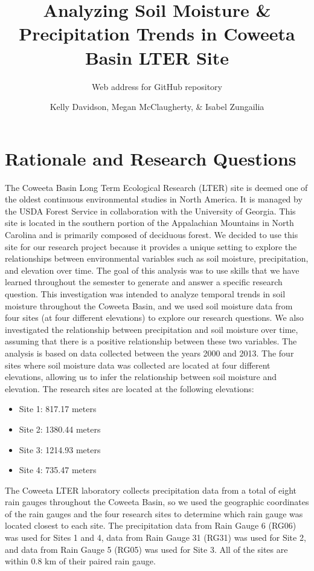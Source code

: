 \documentclass[
  12pt,
]{article}
\title{Analyzing Soil Moisture \& Precipitation Trends in Coweeta Basin
LTER Site}
\subtitle{Web address for GitHub repository}
\author{Kelly Davidson, Megan McClaugherty, \& Isabel Zungailia}
\date{}
\providecommand{\tightlist}{%
  \setlength{\itemsep}{0pt}\setlength{\parskip}{0pt}}
\begin{document}
\maketitle

\newpage
\tableofcontents 
\newpage
\listoftables 
\newpage
\listoffigures 
\newpage

\hypertarget{rationale-and-research-questions}{%
\section{Rationale and Research
Questions}\label{rationale-and-research-questions}}

The Coweeta Basin Long Term Ecological Research (LTER) site is deemed
one of the oldest continuous environmental studies in North America. It
is managed by the USDA Forest Service in collaboration with the
University of Georgia. This site is located in the southern portion of
the Appalachian Mountains in North Carolina and is primarily composed of
deciduous forest. We decided to use this site for our research project
because it provides a unique setting to explore the relationships
between environmental variables such as soil moisture, precipitation,
and elevation over time. The goal of this analysis was to use skills
that we have learned throughout the semester to generate and answer a
specific research question. This investigation was intended to analyze
temporal trends in soil moisture throughout the Coweeta Basin, and we
used soil moisture data from four sites (at four different elevations)
to explore our research questions. We also investigated the relationship
between precipitation and soil moisture over time, assuming that there
is a positive relationship between these two variables. The analysis is
based on data collected between the years 2000 and 2013. The four sites
where soil moisture data was collected are located at four different
elevations, allowing us to infer the relationship between soil moisture
and elevation. The research sites are located at the following
elevations:

\begin{itemize}
\tightlist
\item
  Site 1: 817.17 meters
\item
  Site 2: 1380.44 meters
\item
  Site 3: 1214.93 meters
\item
  Site 4: 735.47 meters
\end{itemize}

The Coweeta LTER laboratory collects precipitation data from a total of
eight rain gauges throughout the Coweeta Basin, so we used the
geographic coordinates of the rain gauges and the four research sites to
determine which rain gauge was located closest to each site. The
precipitation data from Rain Gauge 6 (RG06) was used for Sites 1 and 4,
data from Rain Gauge 31 (RG31) was used for Site 2, and data from Rain
Gauge 5 (RG05) was used for Site 3. All of the sites are within 0.8 km
of their paired rain gauge.
\end{document}
